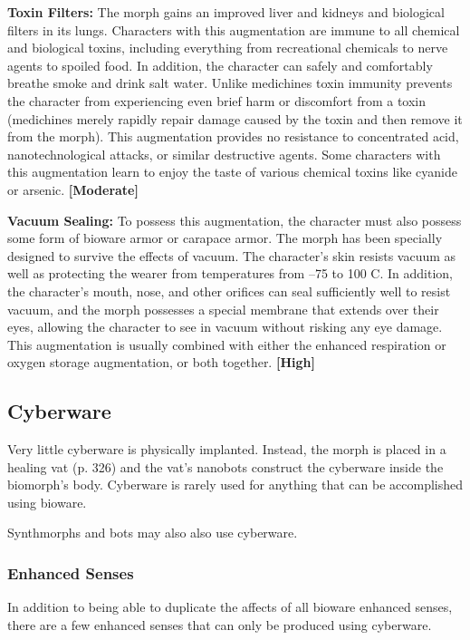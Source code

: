 \textbf{Toxin Filters: }The morph gains an improved liver 
and kidneys and biological filters in its lungs. Characters
with this augmentation are immune to all chemical
and biological toxins, including everything from
recreational chemicals to nerve agents to spoiled food. 
In addition, the character can safely and comfortably 
breathe smoke and drink salt water. Unlike medichines
toxin immunity prevents the character from experiencing
even brief harm or discomfort from a toxin
(medichines merely rapidly repair damage caused by 
the toxin and then remove it from the morph). This 
augmentation provides no resistance to concentrated 
acid, nanotechnological attacks, or similar destructive
agents. Some characters with this augmentation
learn to enjoy the taste of various chemical toxins like 
cyanide or arsenic. \textbf{[Moderate]}

\textbf{Vacuum Sealing:} To possess this augmentation, the 
character must also possess some form of bioware 
armor or carapace armor. The morph has been specially
designed to survive the effects of vacuum. The
character's skin resists vacuum as well as protecting 
the wearer from temperatures from –75 to 100 C. 
In addition, the character's mouth, nose, and other 
orifices can seal sufficiently well to resist vacuum, 
and the morph possesses a special membrane that 
extends over their eyes, allowing the character to 
see in vacuum without risking any eye damage. This 
augmentation is usually combined with either the enhanced
respiration or oxygen storage augmentation,
or both together. \textbf{[High]}

\subsection{Cyberware}

Very little cyberware is physically implanted. Instead, 
the morph is placed in a healing vat (p. 326) and the 
vat's nanobots construct the cyberware inside the biomorph's
body. Cyberware is rarely used for anything
that can be accomplished using bioware.

Synthmorphs and bots may also also use cyberware.

\subsubsection{Enhanced Senses}

In addition to being able to duplicate the affects of all 
bioware enhanced senses, there are a few enhanced 
senses that can only be produced using cyberware.

